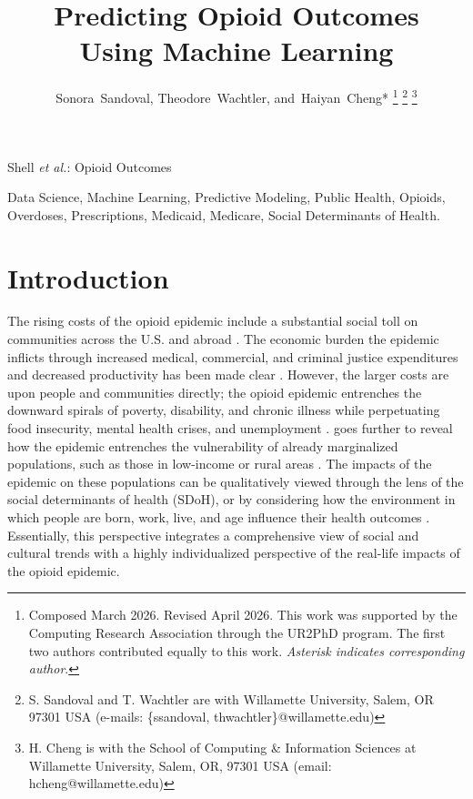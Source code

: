 \documentclass[journal]{IEEEtran}
\begin{document}
    \title{Predicting Opioid Outcomes\\ Using Machine Learning}
    \author{Sonora~Sandoval, Theodore~Wachtler, and~Haiyan~Cheng*%
    \thanks{Composed March 2026. Revised April 2026.
    This work was supported by the Computing Research Association through the UR2PhD program.
    The first two authors contributed equally to this work.
    \textit{Asterisk indicates corresponding author}.}%
    \thanks{S. Sandoval and T. Wachtler are with Willamette University, Salem, OR 97301 USA (e-mails: \{ssandoval, thwachtler\}@willamette.edu)}%
    \thanks{H. Cheng is with the School of Computing \& Information Sciences at Willamette University, Salem, OR, 97301 USA (email: hcheng@willamette.edu)}}

    {Shell \MakeLowercase{\textit{et al.}}: Opioid Outcomes}

    \maketitle

    \begin{IEEEkeywords}
        Data Science, Machine Learning, Predictive Modeling, Public Health, Opioids, Overdoses, Prescriptions, Medicaid, Medicare, Social Determinants of Health.
    \end{IEEEkeywords}

    \IEEEpeerreviewmaketitle


    \section{Introduction}

    The rising costs of the opioid epidemic include a substantial social toll on communities across the U.S. and abroad \cite{cdcUnderstandingOpioidOverdose2025}. The economic burden the epidemic inflicts through increased medical, commercial, and criminal justice expenditures and decreased productivity has been made clear \cite{murphyCostOpioidUse2020}. However, the larger costs are upon people and communities directly; the opioid epidemic entrenches the downward spirals of poverty, disability, and chronic illness while perpetuating food insecurity, mental health crises, and unemployment \cite{dasguptaOpioidCrisisNo2018}. \citeauthor{juddOpioidEpidemicReview2023} goes further to reveal how the epidemic entrenches the vulnerability of already marginalized populations, such as those in low-income or rural areas \cite{juddOpioidEpidemicReview2023}. The impacts of the epidemic on these populations can be qualitatively viewed through the lens of the social determinants of health (SDoH), or by considering how the environment in which people are born, work, live, and age influence their health outcomes \cite{cdcSocialDeterminantsHealth2024, markatouSocialDeterminantsHealth2023}. Essentially, this perspective integrates a comprehensive view of social and cultural trends with a highly individualized perspective of the real-life impacts of the opioid epidemic.
\end{document}
